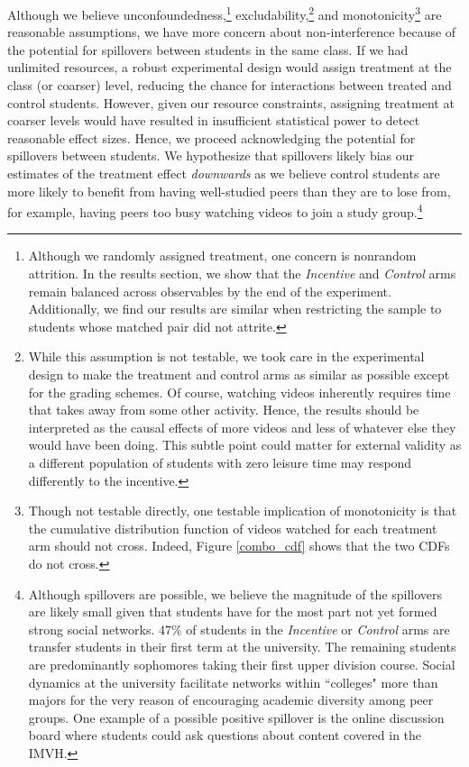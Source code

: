 \documentclass[12pt]{article}
\begin{document}
Although we believe unconfoundedness,\footnote{Although we randomly assigned treatment, one concern is nonrandom attrition. In the results section, we show that the \textit{Incentive} and \textit{Control} arms remain balanced across observables by the end of the experiment. Additionally, we find our results are similar when restricting the sample to students whose matched pair did not attrite.} excludability,\footnote{While this assumption is not testable, we took care in the experimental design to make the treatment and control arms as similar as possible except for the grading schemes. Of course, watching videos inherently requires time that takes away from some other activity. Hence, the results should be interpreted as the causal effects of more videos and less of whatever else they would have been doing. This subtle point could matter for external validity as a different population of students with zero leisure time may respond differently to the incentive.} and monotonicity\footnote{Though not testable directly, one testable implication of monotonicity is that the cumulative distribution function of videos watched for each treatment arm should not cross. Indeed, Figure \ref{combo_cdf} shows that the two CDFs do not cross.} are reasonable assumptions, we have more concern about non-interference because of the potential for spillovers between students in the same class. If we had unlimited resources, a robust experimental design would assign treatment at the class (or coarser) level, reducing the chance for interactions between treated and control students. However, given our resource constraints, assigning treatment at coarser levels would have resulted in insufficient statistical power to detect reasonable effect sizes. Hence, we proceed acknowledging the potential for spillovers between students. We hypothesize that spillovers likely bias our estimates of the treatment effect \textit{downwards} as we believe control students are more likely to benefit from having well-studied peers than they are to lose from, for example, having peers too busy watching videos to join a study group.\footnote{Although spillovers are possible, we believe the magnitude of the spillovers are likely small given that students have for the most part not yet formed strong social networks. 47\% of students in the \textit{Incentive} or \textit{Control} arms are transfer students in their first term at the university. The remaining students are predominantly sophomores taking their first upper division course. Social dynamics at the university facilitate networks within ``colleges" more than majors for the very reason of encouraging academic diversity among peer groups. One example of a possible positive spillover is the online discussion board where students could ask questions about content covered in the IMVH.}
\end{document}
